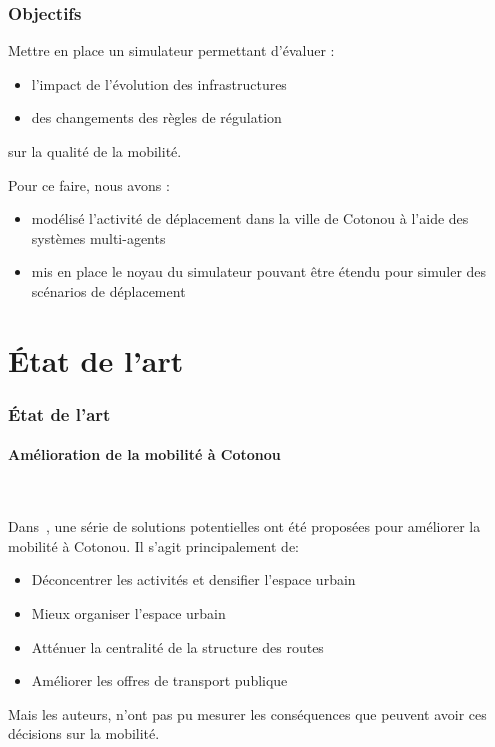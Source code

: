 \begin{frame}
    \frametitle{Objectifs}
    Mettre en place un simulateur permettant d'évaluer :
    \begin{itemize}
        \item l'impact de l'évolution des infrastructures
        \item des changements des règles de régulation
    \end{itemize}
    \pause{}%
    sur la qualité de la mobilité.

    Pour ce faire, nous avons :
    \begin{itemize}
        \item modélisé l'activité de déplacement dans la ville de Cotonou à l'aide des systèmes multi-agents
        \item mis en place le noyau du simulateur pouvant être étendu pour simuler des scénarios de déplacement
    \end{itemize}
\end{frame}


\section{État de l'art}\label{sec:etat_art}
\begin{frame}
    \frametitle{État de l'art}
    \framesubtitle{Amélioration de la mobilité à Cotonou}

    \begin{block}{~\autocite{adonon_problematique}}

    Dans~\autocite{adonon_problematique}, une série de solutions potentielles ont été proposées pour améliorer la mobilité à Cotonou.
    Il s'agit principalement de:

    \begin{itemize}
        \item Déconcentrer les activités et densifier l'espace urbain
        \item Mieux organiser l'espace urbain
        \item Atténuer la centralité de la structure des routes
        \item Améliorer les offres de transport publique
    \end{itemize}

    \end{block}
    \pause{}
    Mais les auteurs, n'ont pas pu mesurer les conséquences que peuvent avoir ces décisions sur la mobilité.
\end{frame}

